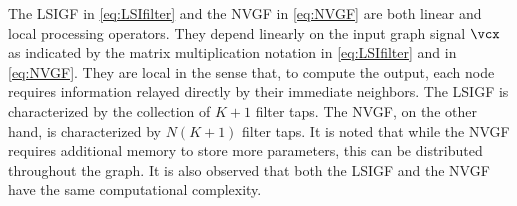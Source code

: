 The LSIGF in \eqref{eq:LSIfilter} and the NVGF in \eqref{eq:NVGF} are both linear and local processing operators. They depend linearly on the input graph signal $\vcx$ as indicated by the matrix multiplication notation in \eqref{eq:LSIfilter} and in \eqref{eq:NVGF}. They are local in the sense that, to compute the output, each node requires information relayed directly by their immediate neighbors. The LSIGF is characterized by the collection of $K+1$ filter taps. The NVGF, on the other hand, is characterized by $N(K+1)$ filter taps. It is noted that while the NVGF requires additional memory to store more parameters, this can be distributed throughout the graph. It is also observed that both the LSIGF and the NVGF have the same computational complexity.


